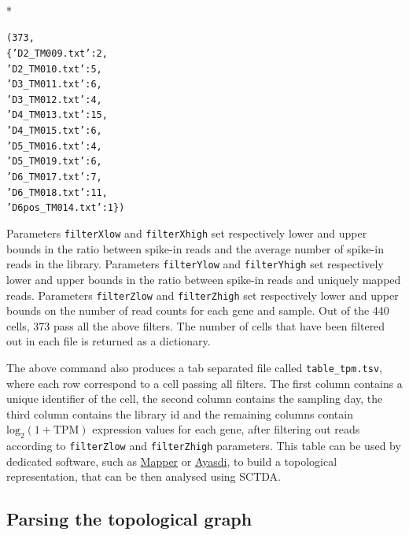 \documentclass[letterpaper,10pt,english]{/usr/share/sphinx/texinputs/sphinxhowto}
\def\smaller{\fontsize{9.5pt}{9.5pt}\selectfont}
\newenvironment{InvisibleVerbatim}
        {\begin{mdframed}[leftmargin=0.1\linewidth,innerleftmargin=3pt,innerrightmargin=3pt, userdefinedwidth=1\linewidth, linewidth=0pt, linecolor=white, usetwoside=false]}
        {\end{mdframed}}
\begin{document}
        

            
                \makebox[0.1\linewidth]{\smaller\hfill\tt\color{nbframe-out-prompt}Out\hspace{4pt}{[}4{]}:\hspace{4pt}}\\*
                \vspace{-1.9\baselineskip}\begin{InvisibleVerbatim}
\begin{alltt}(373,
 \{'D2\_TM009.txt': 2,
  'D2\_TM010.txt': 5,
  'D3\_TM011.txt': 6,
  'D3\_TM012.txt': 4,
  'D4\_TM013.txt': 15,
  'D4\_TM015.txt': 6,
  'D5\_TM016.txt': 4,
  'D5\_TM019.txt': 6,
  'D6\_TM017.txt': 7,
  'D6\_TM018.txt': 11,
  'D6pos\_TM014.txt': 1\})\end{alltt}

            \end{InvisibleVerbatim}
            
        
    
Parameters \texttt{filterXlow} and \texttt{filterXhigh} set respectively lower and upper
bounds in the ratio between spike-in reads and the average number of
spike-in reads in the library. Parameters \texttt{filterYlow} and \texttt{filterYhigh} set
respectively lower and upper bounds in the ratio between spike-in reads
and uniquely mapped reads. Parameters \texttt{filterZlow} and \texttt{filterZhigh} set
respectively lower and upper bounds on the number of read counts for
each gene and sample. Out of the 440 cells, 373 pass all the above
filters. The number of cells that have been filtered out in each file is
returned as a dictionary.

The above command also produces a tab separated file called
\texttt{table\_tpm.tsv}, where each row correspond to a cell passing all filters.
The first column contains a unique identifier of the cell, the second
column contains the sampling day, the third column contains the library
id and the remaining columns contain $\textrm{log}_2(1+\textrm{TPM})$ expression values for
each gene, after filtering out reads according to \texttt{filterZlow} and
\texttt{filterZhigh} parameters. This table can be used by dedicated software,
such as \href{http://danifold.net/mapper/}{Mapper} or \href{http://www.ayasdi.com/}{Ayasdi}, to build a topological representation, that
can be then analysed using SCTDA.

\subsection{Parsing the topological graph}
\end{document}
